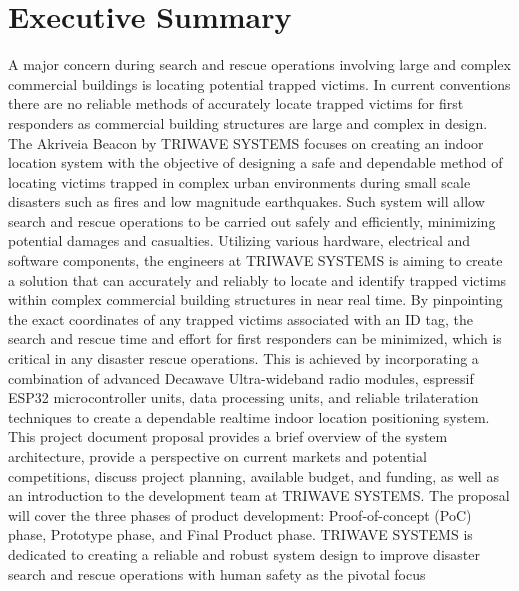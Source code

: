 

\section*{Executive Summary}	%
\bigskip
A major concern during search and rescue operations involving large and complex commercial buildings is locating potential trapped victims. In current conventions there are no reliable methods of accurately locate trapped victims for first responders as commercial building structures are large and complex in design. The Akriveia Beacon by TRIWAVE SYSTEMS focuses on creating an indoor location system with the objective of designing a safe and dependable method of locating victims trapped in complex urban environments during small scale disasters such as fires and low magnitude earthquakes. Such system will allow search and rescue operations to be carried out safely and efficiently, minimizing potential damages and casualties.
\bigskip
Utilizing various hardware, electrical and software components, the engineers at TRIWAVE SYSTEMS is aiming to create a solution that can accurately and reliably to locate and identify trapped victims within complex commercial building structures in near real time. By pinpointing the exact coordinates of any trapped victims associated with an ID tag, the search and rescue time and effort for first responders can be minimized, which is critical in any disaster rescue operations. This is achieved by incorporating a combination of advanced Decawave Ultra-wideband radio modules, espressif ESP32 microcontroller units, data processing units, and reliable trilateration techniques to create a dependable realtime indoor location positioning system.
\bigskip
This project document proposal provides a brief overview of the system architecture, provide a perspective on current markets and potential competitions, discuss project planning, available budget, and funding, as well as an introduction to the development team at TRIWAVE SYSTEMS. The proposal will cover the three phases of product development: Proof-of-concept (PoC) phase, Prototype phase, and Final Product phase.
\bigskip
TRIWAVE SYSTEMS is dedicated to creating a reliable and robust system design to improve disaster search and rescue operations with human safety as the pivotal focus
